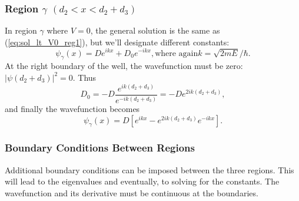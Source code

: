 \documentclass[aps,twocolumn,secnumarabic,nobalancelastpage,amsmath,amssymb,
nofootinbib]{revtex4}
\begin{document}
\subsubsection{Region $\gamma$ $(d_2 < x < d_2+d_3)$}
In region $\gamma$ where $V=0$, the general solution is the same as (\ref{eq:sol_lt_V0_reg1}), but we'll designate different constants:
\begin{subequations}
\label{eq:sol_lt_V0_reg3}
\begin{equation}
\psi_\gamma(x) = D e^{ikx} + D_0 e^{-ikx},
\end{equation}
\text{where again}
\begin{equation}
k=\sqrt{2mE}/\hbar.
\end{equation}
\end{subequations}
%
At the right boundary of the well, the wavefunction must be zero: $|\psi(d_2+d_3)|^2=0$. Thus
\begin{equation}
D_0 = -D \frac{e^{ik(d_2+d_3)}}{e^{-ik(d_2+d_3)}} = -D e^{2ik(d_2+d_3)},
\label{eq:D0_defn}
\end{equation}
%
and finally the wavefunction becomes
\begin{equation}
\psi_\gamma(x)=D[e^{ikx} - e^{2ik(d_2+d_3)} e^{-ikx}].
\label{eq:psi_lt_V0_reg3}
\end{equation}
\subsubsection{Boundary Conditions Between Regions}
Additional boundary conditions can be imposed between the three regions. This
will lead to the eigenvalues and eventually, to solving for the constants.
The wavefunction and its derivative must be continuous at the boundaries.
\end{document}
